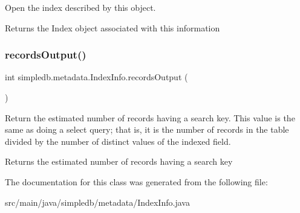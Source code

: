 Open the index described by this object. \begin{DoxyReturn}{Returns}
the Index object associated with this information 
\end{DoxyReturn}
\mbox{\label{classsimpledb_1_1metadata_1_1IndexInfo_aa262013b08ce555a6c63ff1cbb2899d1}} 
\subsubsection{\texorpdfstring{records\+Output()}{recordsOutput()}}
{\footnotesize\ttfamily int simpledb.\+metadata.\+Index\+Info.\+records\+Output (\begin{DoxyParamCaption}{ }\end{DoxyParamCaption})\hspace{0.3cm}{\ttfamily [inline]}}

Return the estimated number of records having a search key. This value is the same as doing a select query; that is, it is the number of records in the table divided by the number of distinct values of the indexed field. \begin{DoxyReturn}{Returns}
the estimated number of records having a search key 
\end{DoxyReturn}


The documentation for this class was generated from the following file\+:\begin{DoxyCompactItemize}
\item 
src/main/java/simpledb/metadata/Index\+Info.\+java\end{DoxyCompactItemize}
